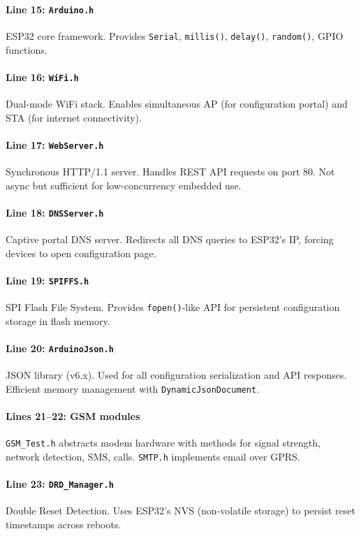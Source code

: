 \documentclass[11pt,a4paper]{article}
\begin{document}
\paragraph{Line 15: \texttt{Arduino.h}}
ESP32 core framework. Provides \texttt{Serial}, \texttt{millis()}, \texttt{delay()}, \texttt{random()}, GPIO functions.

\paragraph{Line 16: \texttt{WiFi.h}}
Dual-mode WiFi stack. Enables simultaneous AP (for configuration portal) and STA (for internet connectivity).

\paragraph{Line 17: \texttt{WebServer.h}}
Synchronous HTTP/1.1 server. Handles REST API requests on port 80. Not async but sufficient for low-concurrency embedded use.

\paragraph{Line 18: \texttt{DNSServer.h}}
Captive portal DNS server. Redirects all DNS queries to ESP32's IP, forcing devices to open configuration page.

\paragraph{Line 19: \texttt{SPIFFS.h}}
SPI Flash File System. Provides \texttt{fopen()}-like API for persistent configuration storage in flash memory.

\paragraph{Line 20: \texttt{ArduinoJson.h}}
JSON library (v6.x). Used for all configuration serialization and API responses. Efficient memory management with \texttt{DynamicJsonDocument}.

\paragraph{Lines 21--22: GSM modules}
\texttt{GSM\_Test.h} abstracts modem hardware with methods for signal strength, network detection, SMS, calls. \texttt{SMTP.h} implements email over GPRS.

\paragraph{Line 23: \texttt{DRD\_Manager.h}}
Double Reset Detection. Uses ESP32's NVS (non-volatile storage) to persist reset timestamps across reboots.
\end{document}
